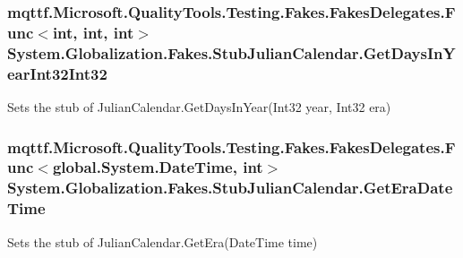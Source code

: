 \hypertarget{class_system_1_1_globalization_1_1_fakes_1_1_stub_julian_calendar_a57641f4b0ff10d5d1d4d1d275146a182}{
\subsubsection[{Get\-Days\-In\-Year\-Int32\-Int32}]{\setlength{\rightskip}{0pt plus 5cm}mqttf.\-Microsoft.\-Quality\-Tools.\-Testing.\-Fakes.\-Fakes\-Delegates.\-Func$<$int, int, int$>$ System.\-Globalization.\-Fakes.\-Stub\-Julian\-Calendar.\-Get\-Days\-In\-Year\-Int32\-Int32}}\label{class_system_1_1_globalization_1_1_fakes_1_1_stub_julian_calendar_a57641f4b0ff10d5d1d4d1d275146a182}


Sets the stub of Julian\-Calendar.\-Get\-Days\-In\-Year(\-Int32 year, Int32 era)

\hypertarget{class_system_1_1_globalization_1_1_fakes_1_1_stub_julian_calendar_a092de93fff2373fc5f4b21151b8a7ff3}{
\subsubsection[{Get\-Era\-Date\-Time}]{\setlength{\rightskip}{0pt plus 5cm}mqttf.\-Microsoft.\-Quality\-Tools.\-Testing.\-Fakes.\-Fakes\-Delegates.\-Func$<$global.\-System.\-Date\-Time, int$>$ System.\-Globalization.\-Fakes.\-Stub\-Julian\-Calendar.\-Get\-Era\-Date\-Time}}\label{class_system_1_1_globalization_1_1_fakes_1_1_stub_julian_calendar_a092de93fff2373fc5f4b21151b8a7ff3}


Sets the stub of Julian\-Calendar.\-Get\-Era(\-Date\-Time time)


